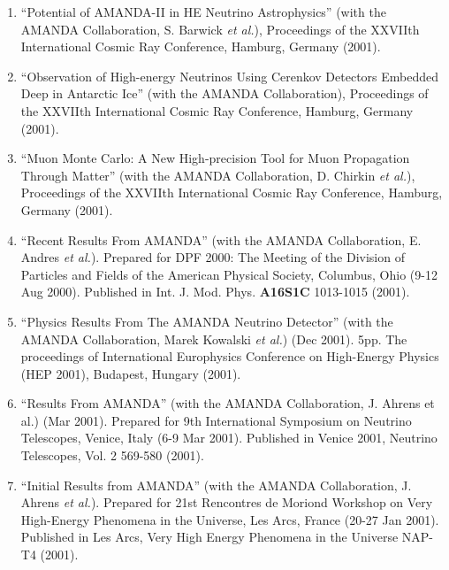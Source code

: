 \begin{enumerate}
\item ``Potential of AMANDA-II in HE Neutrino Astrophysics''
        (with the   AMANDA Collaboration, S. Barwick {\it et
        al.}), Proceedings of the XXVIIth   International
        Cosmic Ray Conference, Hamburg, Germany (2001).

\item ``Observation of High-energy Neutrinos Using Cerenkov
        Detectors   Embedded Deep in Antarctic Ice'' (with
        the AMANDA Collaboration),   Proceedings of the
        XXVIIth International Cosmic Ray Conference,
        Hamburg, Germany (2001).

\item ``Muon Monte Carlo: A New High-precision Tool for Muon
        Propagation   Through Matter'' (with the AMANDA
        Collaboration, D. Chirkin {\it et al.}),
        Proceedings of the XXVIIth International Cosmic Ray
        Conference,   Hamburg, Germany (2001).

\item ``Recent Results From AMANDA'' (with the AMANDA
        Collaboration,   E. Andres {\it et al.}).  Prepared
        for DPF 2000: The Meeting of the   Division of
        Particles and Fields of the American Physical
        Society,   Columbus, Ohio (9-12 Aug 2000).
        Published in   Int. J. Mod. Phys. {\bf A16S1C}
        1013-1015 (2001).

\item ``Physics Results From The AMANDA Neutrino Detector''
        (with the   AMANDA Collaboration, Marek Kowalski
        {\it et al.}) (Dec 2001). 5pp.     The proceedings
        of International Europhysics Conference on
        High-Energy Physics (HEP 2001), Budapest, Hungary
        (2001).

\item ``Results From AMANDA'' (with the AMANDA
        Collaboration, J. Ahrens et   al.) (Mar 2001).
        Prepared for 9th International Symposium on
        Neutrino Telescopes, Venice, Italy (6-9 Mar 2001).
        Published in   Venice 2001, Neutrino Telescopes,
        Vol. 2 569-580 (2001).

\item ``Initial Results from AMANDA'' (with the AMANDA
        Collaboration,   J. Ahrens {\it et al.}).  Prepared
        for 21st Rencontres de Moriond Workshop   on Very
        High-Energy Phenomena in the Universe, Les Arcs,
        France   (20-27 Jan 2001).  Published in Les Arcs,
        Very High Energy   Phenomena in the Universe NAP-T4
        (2001).


\end{enumerate}
